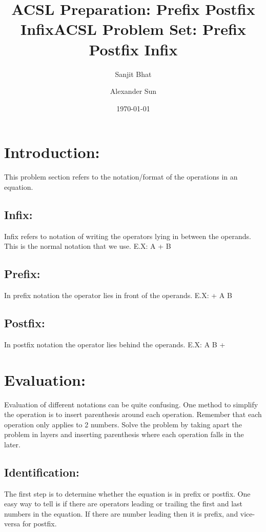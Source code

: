 \documentclass{article}
\title{ACSL Preparation: Prefix Postfix Infix}
\author{Sanjit Bhat \and Alexander Sun}
\date{\today}
\begin{document}
\maketitle

\newpage

\begin{center}
    \title{ACSL Problem Set: Prefix Postfix Infix}
\end{center}

\section{Introduction:}
This problem section refers to the notation/format of the operations in an equation. 

\subsection{Infix:}
Infix refers to notation of writing the operators lying in between the operands. This is the normal notation that we use. E.X: A + B

\subsection{Prefix:}
In prefix notation the operator lies in front of the operands. E.X: + A B

\subsection{Postfix:}
In postfix notation the operator lies behind the operands. E.X: A B +

\section{Evaluation:}
Evaluation of different notations can be quite confusing. One method to simplify the operation is to insert parenthesis around each operation. Remember that each operation only applies to 2 numbers. Solve the problem by taking apart the problem in layers and inserting parenthesis where each operation falls in the later. 

\subsection{Identification:}
The first step is to determine whether the equation is in prefix or postfix. One easy way to tell is if there are operators leading or trailing the first and last numbers in the equation. If there are number leading then it is prefix, and vice-versa for postfix.
\end{document}
